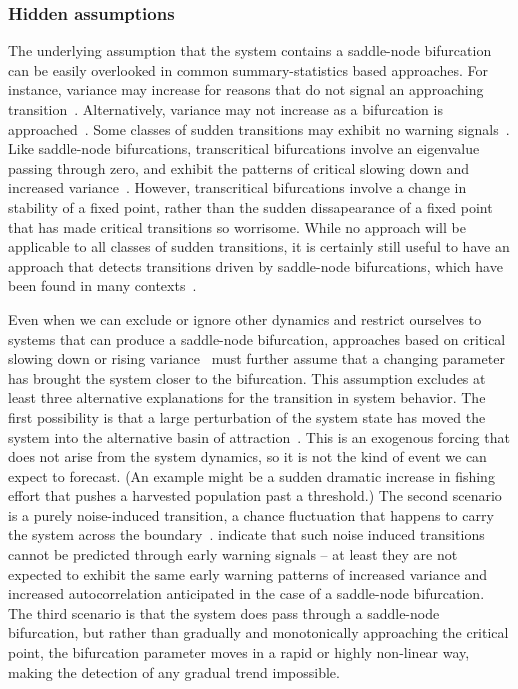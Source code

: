 \documentclass[authoryear,review,11pt]{elsarticle}
\begin{document}
\subsubsection*{Hidden assumptions}
The underlying assumption that the system contains a saddle-node bifurcation
can be easily overlooked in common summary-statistics based approaches.
For instance, variance may increase for reasons that
do not signal an approaching transition~\citep{Schreiber2003, Schreiber2008}.
Alternatively, variance may not increase as a bifurcation is approached~\citep{Livina2012, Dakos2011a}.
Some classes of sudden transitions may exhibit no warning signals~\cite{Hastings2010}.
Like saddle-node bifurcations, transcritical bifurcations involve an eigenvalue passing through zero,
and exhibit the patterns of critical slowing down and increased variance~\citep{Drake2010}.  
However, transcritical bifurcations involve a change in stability of a fixed point, rather
than the sudden dissapearance of a fixed point that has made critical transitions so worrisome.%
While no approach will be applicable to all classes of sudden transitions,
it is certainly still useful to have an approach that detects transitions driven by
saddle-node bifurcations, which have been found in many contexts~\citep[\emph{e.g.}, see][]{Scheffer2001}.

Even when we can exclude or ignore other dynamics and
restrict ourselves to systems that can produce a saddle-node bifurcation,
approaches based on critical slowing down or rising variance~\citep[\emph{e.g.}][]{Held2004, Scheffer2009, Carpenter2011}
must further assume that a changing parameter has brought the system closer to the bifurcation.
This assumption excludes at least three alternative explanations for the transition in system behavior.
The first possibility is that a large perturbation of the system state
has moved the system into the alternative basin of attraction~\citep{Scheffer2001}.
This is an exogenous forcing that does not arise from the system dynamics, so it is not the kind of event we can expect to forecast.
(An example might be a sudden dramatic increase in fishing effort that pushes a harvested population past a threshold.)
The second scenario is a purely noise-induced transition, a chance fluctuation that happens to carry the system across the boundary~\citep{Ditlevsen2010}.
\citet{Livina2012} indicate that such noise induced transitions cannot be predicted through early warning signals -- 
at least they are not expected to exhibit the same early warning patterns of increased variance and increased autocorrelation
anticipated in the case of a saddle-node bifurcation.
The third scenario is that the system does pass through a saddle-node bifurcation,
but rather than gradually and monotonically approaching the critical point, the
bifurcation parameter moves in a rapid or highly non-linear way, making the detection of any gradual trend impossible.
\end{document}
